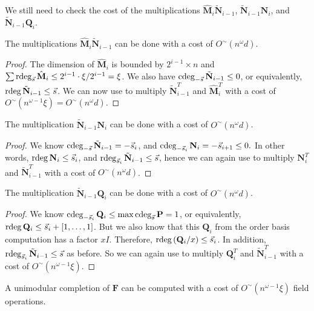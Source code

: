 

We still need to check the cost of the multiplications $\hat{\mathbf{M}}_{i}\tilde{\mathbf{N}}_{i-1}$,
$\tilde{\mathbf{N}}_{i-1}\mathbf{N}_{i}$, and $\tilde{\mathbf{N}}_{i-1}\mathbf{Q}_{i}$. 
\begin{lem}
The multiplications $\hat{\mathbf{M}}_{i}\tilde{\mathbf{N}}_{i-1}$
can be done with a cost of $O^{\sim}\left(n^{\omega}d\right)$.\end{lem}
\begin{proof}
The dimension of $\hat{\mathbf{M}}_{i}$ is bounded by $2^{i-1}\times n$
and $\sum\rdeg_{\vec{s}}\hat{\mathbf{M}}_{i}\le2^{i-1}\cdot\xi/2^{i-1}=\xi$.
We also have $\cdeg_{-\vec{s}}\tilde{\mathbf{N}}_{i-1}\le0$, or equivalently,
$\rdeg\tilde{\mathbf{N}}_{i-1}\le\vec{s}$. We can now use 
to multiply $\tilde{\mathbf{N}}_{i-1}^{T}$ and $\hat{\mathbf{M}}_{i}^{T}$
with a cost of $O^{\sim}\left(n^{\omega-1}\xi\right)=O^{\sim}\left(n^{\omega}d\right)$.\end{proof}
\begin{lem}
The multiplication $\tilde{\mathbf{N}}_{i-1}\mathbf{N}_{i}$ can be
done with a cost of $O^{\sim}\left(n^{\omega}d\right)$.\end{lem}
\begin{proof}
We know $\cdeg_{-\vec{s}}\tilde{\mathbf{N}}_{i-1}=-\vec{s}_{i}$,
and $\cdeg_{-\vec{s}_{i}}\mathbf{N}_{i}=-\vec{s}_{i+1}\le0.$ In other
words, $\rdeg\mathbf{N}_{i}\le\vec{s}_{i}$, and $\rdeg_{\vec{s}_{i}}\tilde{\mathbf{N}}_{i-1}\le\vec{s}$,
hence we can again use 
to multiply $\mathbf{N}_{i}^{T}$ and $\tilde{\mathbf{N}}_{i-1}^{T}$
with a cost of $O^{\sim}\left(n^{\omega}d\right)$.\end{proof}
\begin{lem}
The multiplication $\tilde{\mathbf{N}}_{i-1}\mathbf{Q}_{i}$ can be
done with a cost of $O^{\sim}\left(n^{\omega}d\right)$.\end{lem}
\begin{proof}
We know $\cdeg_{-\vec{s}_{i}}\mathbf{Q}_{i}\le\max\cdeg_{\vec{s}}\mathbf{P}=1$,
or equivalently, $\rdeg\mathbf{Q}_{i}\le\vec{s}_{i}+\left[1,\dots,1\right]$.
But we also know that this $\mathbf{Q}_{i}$ from the order basis
computation has a factor $xI$. Therefore, $\rdeg\left(\mathbf{Q}_{i}/x\right)\le\vec{s}_{i}$.
In addition, $\rdeg_{\vec{s}_{i}}\tilde{\mathbf{N}}_{i-1}\le\vec{s}$
as before. So we can again use 
to multiply $\mathbf{Q}_{i}^{T}$ and $\tilde{\mathbf{N}}_{i-1}^{T}$
with a cost of $O^{\sim}\left(n^{\omega-1}\xi\right)$.\end{proof}
\begin{thm}
A unimodular completion of $\mathbf{F}$ can be computed with a cost
of $O^{\sim}\left(n^{\omega-1}\xi\right)$ field operations.\end{thm}

